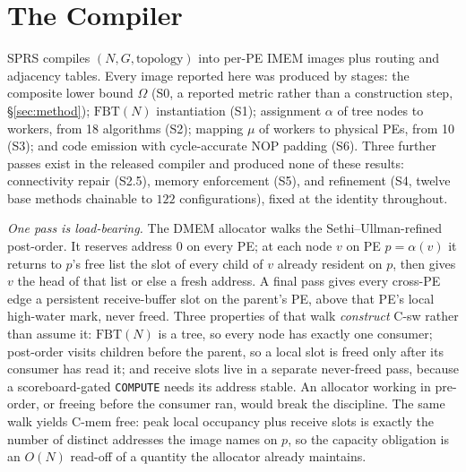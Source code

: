 \documentclass[journal,10pt]{IEEEtran}
\theoremstyle{plain}
\theoremstyle{definition}
\theoremstyle{remark}
\newcommand{\FBT}{\ensuremath{\mathrm{FBT}}}
\newcommand{\sprs}{\textsc{SPRS}}
\newcommand{\asgn}{\ensuremath{\alpha}}
\newcommand{\map}{\ensuremath{\mu}}
\begin{document}
\section{The Compiler}\label{sec:compiler}

\sprs{} compiles $(N, G, \text{topology})$ into per-PE IMEM images plus
routing and adjacency tables. Every image reported here was produced by
\StagesRun{} stages: the composite lower bound $\Omega$ (S0, a reported metric
rather than a construction step, \S\ref{sec:method}); $\FBT(N)$ instantiation
(S1); assignment $\asgn$ of tree nodes to workers, from 18 algorithms (S2);
mapping $\map$ of workers to physical PEs, from 10 (S3); and code emission
with cycle-accurate NOP padding (S6). Three further passes exist in the
released compiler and produced none of these results: connectivity repair
(S2.5), memory enforcement (S5), and refinement (S4, twelve base methods
chainable to $122$ configurations), fixed at the identity throughout.

\emph{One pass is load-bearing.} The DMEM allocator walks the
Sethi--Ullman-refined post-order. It reserves address $0$ on every PE; at each
node $v$ on PE $p=\asgn(v)$ it returns to $p$'s free list the slot of every
child of $v$ already resident on $p$, then gives $v$ the head of that list or
else a fresh address. A final pass gives every cross-PE edge a persistent
receive-buffer slot on the parent's PE, above that PE's local high-water mark,
never freed. Three properties of that walk \emph{construct} \textsf{C-sw}
rather than assume it: $\FBT(N)$ is a tree, so every node has exactly one
consumer; post-order visits children before the parent, so a local slot is
freed only after its consumer has read it; and receive slots live in a
separate never-freed pass, because a scoreboard-gated \texttt{COMPUTE} needs
its address stable. An allocator working in pre-order, or freeing before the
consumer ran, would break the discipline. The same walk yields \textsf{C-mem}
free: peak local occupancy plus receive slots is exactly the number of
distinct addresses the image names on $p$, so the capacity obligation is an
$O(N)$ read-off of a quantity the allocator already maintains.
\end{document}
